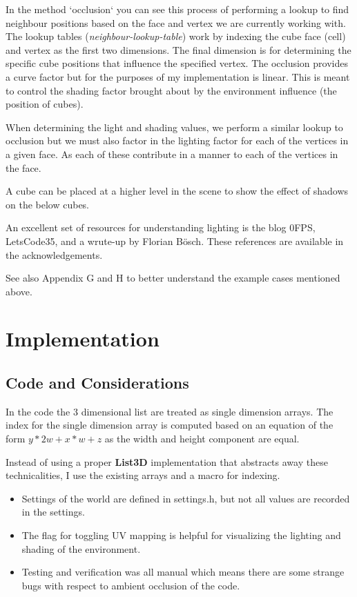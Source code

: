 \documentclass{book}
\begin{document}
In the method `occlusion` you can see this process of performing a lookup to find neighbour positions based on the face and vertex we are currently working with.  The lookup tables (\textit{neighbour-lookup-table}) work by indexing the cube face (cell) and vertex as the first two dimensions.  The final dimension is for determining the specific cube positions that influence the specified vertex.  The occlusion provides a curve factor but for the purposes of my implementation is linear.  This is meant to control the shading factor brought about by the environment influence (the position of cubes).
    
When determining the light and shading values, we perform a similar lookup to occlusion but we must also factor in the lighting factor for each of the vertices in a given face.  As each of these contribute in a manner to each of the vertices in the face.
    
A cube can be placed at a higher level in the scene to show the effect of shadows on the below cubes.
    
An excellent set of resources for understanding lighting is the blog 0FPS, LetsCode35, and a wrute-up by Florian Bösch.  These references are available in the acknowledgements.
    
See also Appendix G and H to better understand the example cases mentioned above.
    
\section{Implementation}
\subsection{Code and Considerations}
In the code the 3 dimensional list are treated as single dimension arrays.  The index for the single dimension array is computed based on an equation of the form $y * 2w + x*w + z$ as the width and height component are equal.
    
Instead of using a proper \textbf{List3D} implementation that abstracts away these technicalities, I use the existing arrays and a macro for indexing.  
    
\begin{itemize}
	\item Settings of the world are defined in settings.h, but not all values are recorded in the settings.
	      
	\item The flag for toggling UV mapping is helpful for visualizing the lighting and shading of the environment.
	      
	\item Testing and verification was all manual which means there are some strange bugs with respect to ambient occlusion of the code.
\end{itemize}
\end{document}
